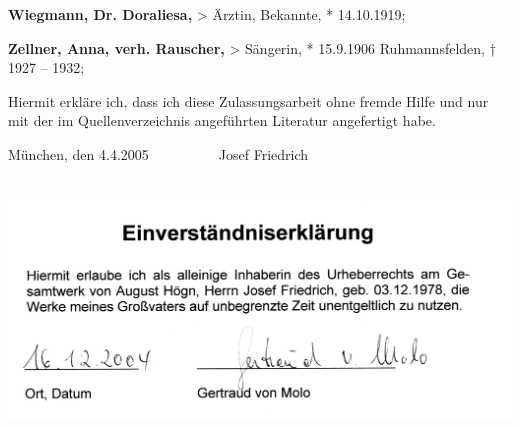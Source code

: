 \documentclass[a4paper]{article}
\begin{document}
\textbf{Wiegmann, Dr. Doraliesa,} {\textgreater} Ärztin, Bekannte, *
14.10.1919;

\textbf{Zellner, Anna, verh. Rauscher,} {\textgreater} Sängerin, *
15.9.1906 Ruhmannsfelden, † 1927 – 1932;


Hiermit erkläre ich, dass ich diese Zulassungsarbeit ohne fremde Hilfe
und nur mit der im Quellenverzeichnis angeführten Literatur angefertigt
habe.

München, den 4.4.2005\ \ \ \ \ \ \ \ \ \ Josef Friedrich


\includegraphics[width=15.946cm,height=6.943cm]{pictures/zulassungsarbeit-img124.png}
\end{document}
